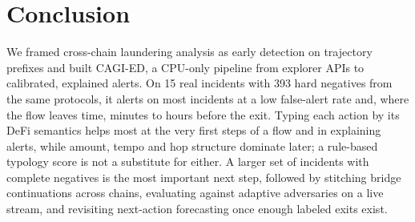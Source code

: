 \section{Conclusion}
\label{sec:conclusion}

We framed cross-chain laundering analysis as early detection on trajectory prefixes and built CAGI-ED, a CPU-only pipeline from explorer APIs to calibrated, explained alerts.
On 15 real incidents with 393 hard negatives from the same protocols, it alerts on most incidents at a low false-alert rate and, where the flow leaves time, minutes to hours before the exit.
Typing each action by its DeFi semantics helps most at the very first steps of a flow and in explaining alerts, while amount, tempo and hop structure dominate later; a rule-based typology score is not a substitute for either.
A larger set of incidents with complete negatives is the most important next step, followed by stitching bridge continuations across chains, evaluating against adaptive adversaries on a live stream, and revisiting next-action forecasting once enough labeled exits exist.
